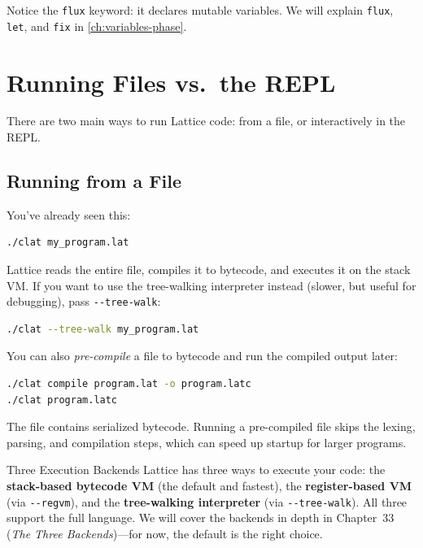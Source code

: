 Notice the \lstinline|flux| keyword: it declares mutable variables.
We will explain \lstinline|flux|, \lstinline|let|, and \lstinline|fix| in \cref{ch:variables-phase}.

\section{Running Files vs.\ the REPL}\label{sec:files-vs-repl}

There are two main ways to run Lattice code: from a file, or interactively in the REPL\@.

\subsection{Running from a File}\label{subsec:running-file}

You've already seen this:

\begin{lstlisting}[language=bash, numbers=none]
./clat my_program.lat
\end{lstlisting}

Lattice reads the entire file, compiles it to bytecode, and executes it on the stack VM\@.
If you want to use the tree-walking interpreter instead (slower, but useful for debugging), pass \lstinline|--tree-walk|:

\begin{lstlisting}[language=bash, numbers=none]
./clat --tree-walk my_program.lat
\end{lstlisting}

You can also \emph{pre-compile} a file to bytecode and run the compiled output later:

\begin{lstlisting}[language=bash, numbers=none]
./clat compile program.lat -o program.latc
./clat program.latc
\end{lstlisting}

The  file contains serialized bytecode.
Running a pre-compiled file skips the lexing, parsing, and compilation steps, which can speed up startup for larger programs.

\begin{notebox}{Three Execution Backends}
Lattice has three ways to execute your code: the \textbf{stack-based bytecode VM} (the default and fastest), the \textbf{register-based VM} (via \lstinline|--regvm|), and the \textbf{tree-walking interpreter} (via \lstinline|--tree-walk|).
All three support the full language.
We will cover the backends in depth in Chapter~33 (\emph{The Three Backends})---for now, the default is the right choice.
\end{notebox}


